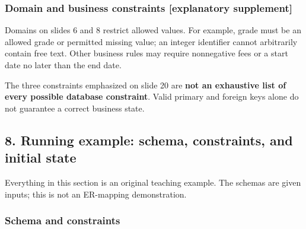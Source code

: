 \subsubsection{Domain and business constraints {[}explanatory supplement{]}}\label{03_relational_model_and_integrity_en-domain-and-business-constraints-explanatory-supplement}

Domains on slides 6 and 8 restrict allowed values. For example, grade must be an allowed grade or permitted missing value; an integer identifier cannot arbitrarily contain free text. Other business rules may require nonnegative fees or a start date no later than the end date.

The three constraints emphasized on slide 20 are \textbf{not an exhaustive list of every possible database constraint}. Valid primary and foreign keys alone do not guarantee a correct business state.

\subsection{8. Running example: schema, constraints, and initial state}\label{03_relational_model_and_integrity_en-running-example-schema-constraints-and-initial-state}

Everything in this section is an original teaching example. The schemas are given inputs; this is not an ER-mapping demonstration.

\subsubsection{Schema and constraints}\label{03_relational_model_and_integrity_en-schema-and-constraints}

